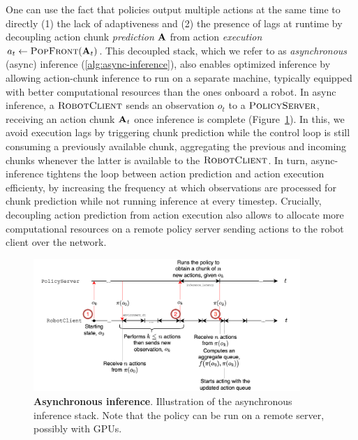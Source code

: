 One can use the fact that policies output multiple actions at the same time to directly (1) the lack of adaptiveness and (2) the presence of lags at runtime by decoupling action chunk \emph{prediction} \( \mathbf{A} \) from action \emph{execution} \( a_t \gets \textsc{PopFront}(\mathbf{A}_t) \).
This decoupled stack, which we refer to as \emph{asynchronous} (async) inference (\ref{alg:async-inference}), also enables optimized inference by allowing action-chunk inference to run on a separate machine, typically equipped with better computational resources than the ones onboard a robot.
In async inference, a \( \textsc{RobotClient} \) sends an observation \( o_t \) to a \( \textsc{PolicyServer} \), receiving an action chunk \( \mathbf{A}_t \) once inference is complete (Figure~\ref{fig:ch4-async-inference}).
In this, we avoid execution lags by triggering chunk prediction while the control loop is still consuming a previously available chunk, aggregating the previous and incoming chunks whenever the latter is available to the \( \textsc{RobotClient} \).
In turn, async-inference tightens the loop between action prediction and action execution efficienty, by increasing the frequency at which observations are processed for chunk prediction while not running inference at every timestep.
Crucially, decoupling action prediction from action execution also allows to allocate more computational resources on a remote policy server sending actions to the robot client over the network.

\begin{figure}
    \centering
    \begin{minipage}[t]{\textwidth}
        \centering
        \includegraphics[width=0.9\textwidth]{figures/ch4/ch4-async-inference.png}
        \caption{\textbf{Asynchronous inference}. Illustration of the asynchronous inference stack. Note that the policy can be run on a remote server, possibly with GPUs.}
        \label{fig:ch4-async-inference}
    \end{minipage}
    \vspace{-0.6cm}
\end{figure}

